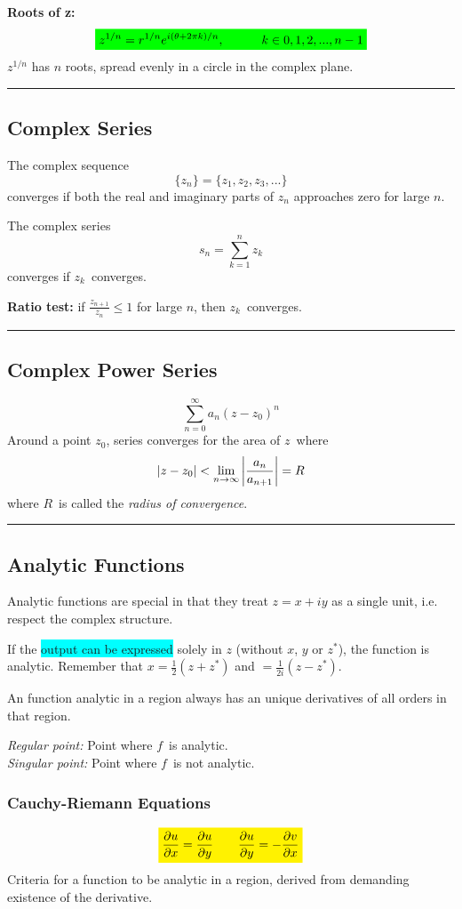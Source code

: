 \documentclass[10pt,a4paper]{article}
\renewcommand{\exp}{e^}
\newcommand{\holine}{\rule{286pt}{1pt}}
\newcommand{\half}{\frac{1}{2}}
\newcommand{\yl}[1]{\colorbox{yellow}{$\displaystyle #1$}}
\newcommand{\gr}[1]{\colorbox{green}{$\displaystyle #1$}}
\newcommand{\bll}{\colorbox{cyan}}
\begin{document}
\begin{multicols}{2}
\textbf{Roots of z:} 
\[\gr{
    z^{1/n} = r^{1/n}\exp{i(\theta + 2\pi k)/n}, \quad\quad\quad k\in 0,1,2,...,n-1
}\]
$z^{1/n}$ has $n$ roots, spread evenly in a circle in the complex plane.



\holine
\subsection*{Complex Series}
The complex sequence
\[
    \{z_n\} = \{z_1, z_2, z_3, ...\}
\]
converges if both the real and imaginary parts of $z_n$ approaches zero for large $n$.

The complex series
\[
    s_n = \sum_{k=1}^n z_k
\]
converges if $z_k$ converges.

\textbf{Ratio test:}
if $\frac{z_{n+1}}{z_n} \leq 1$ for large $n$, then $z_k$ converges.


\holine
\subsection*{Complex Power Series}
\[
    \sum_{n=0}^\infty a_n(z-z_0)^n
\]
Around a point $z_0$, series converges for the area of $z$ where
\[
    |z-z_0| < \lim_{n\rightarrow\infty} \qty|\frac{a_n}{a_{n+1}}| = R
\]
where $R$ is called the \textit{radius of convergence}.


\holine
\subsection*{Analytic Functions}
Analytic functions are special in that they treat $z=x+iy$ as a single unit, i.e. respect the complex structure.

If the \bll{output can be expressed} solely in $z$ (without $x$, $y$ or $z^*$), the function is analytic. Remember that $x = \half (z+z^*)$ and $=\frac{1}{2i}(z-z^*)$.

An function analytic in a region always has an unique derivatives of all orders in that region.


\textit{Regular point:} Point where $f$ is analytic.\\
\textit{Singular point:} Point where $f$ is not analytic.


\subsubsection*{Cauchy-Riemann Equations}
\[\yl{
    \pdv{u}{x} = \pdv{u}{y} \quad\quad \pdv{u}{y} = - \pdv{v}{x}
}\]
Criteria for a function to be analytic in a region, derived from demanding existence of the derivative.




\end{multicols}
\end{document}
